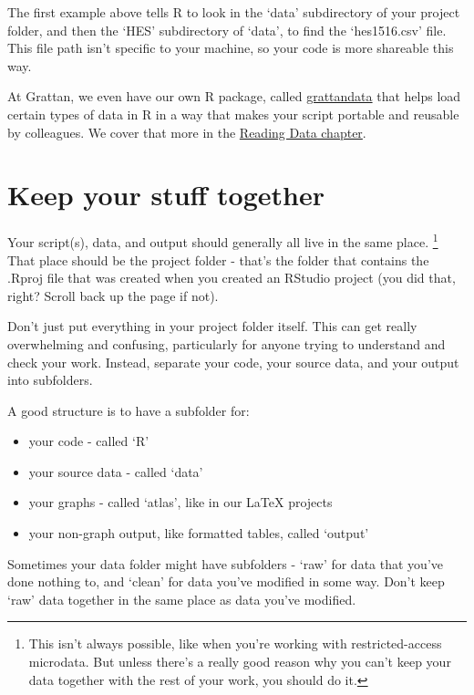 \documentclass[
]{book}
\providecommand{\tightlist}{%
  \setlength{\itemsep}{0pt}\setlength{\parskip}{0pt}}
\begin{document}
The first example above tells R to look in the `data' subdirectory of your project folder, and then the `HES' subdirectory of `data', to find the `hes1516.csv' file. This file path isn't specific to your machine, so your code is more shareable this way.

At Grattan, we even have our own R package, called \href{https://github.com/grattan/grattandata}{grattandata} that helps load certain types of data in R in a way that makes your script portable and reusable by colleagues. We cover that more in the \protect\hyperlink{read_microdata}{Reading Data chapter}.

\hypertarget{keep-your-stuff-together}{%
\section{Keep your stuff together}\label{keep-your-stuff-together}}

Your script(s), data, and output should generally all live in the same place. \footnote{This isn't always possible, like when you're working with restricted-access microdata. But unless there's a really good reason why you can't keep your data together with the rest of your work, you should do it.} That place should be the project folder - that's the folder that contains the .Rproj file that was created when you created an RStudio project (you did that, right? Scroll back up the page if not).

Don't just put everything in your project folder itself. This can get really overwhelming and confusing, particularly for anyone trying to understand and check your work. Instead, separate your code, your source data, and your output into subfolders.

A good structure is to have a subfolder for:

\begin{itemize}
\tightlist
\item
  your code - called `R'
\item
  your source data - called `data'
\item
  your graphs - called `atlas', like in our LaTeX projects
\item
  your non-graph output, like formatted tables, called `output'
\end{itemize}

Sometimes your data folder might have subfolders - `raw' for data that you've done nothing to, and `clean' for data you've modified in some way. Don't keep `raw' data together in the same place as data you've modified.
\end{document}
